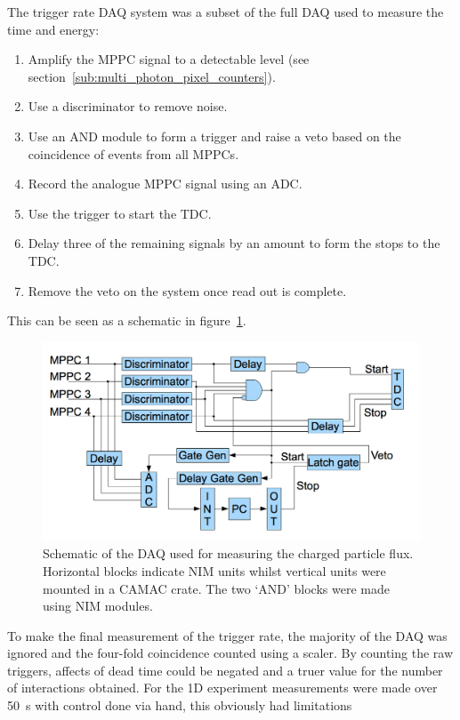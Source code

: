 The trigger rate DAQ system was a subset of the full DAQ used to measure the time and energy:
\begin{enumerate}
  \item Amplify the MPPC signal to a detectable level (see section~\ref{sub:multi_photon_pixel_counters}).
  \item Use a discriminator to remove noise.
  \item Use an AND module to form a trigger and raise a veto based on the coincidence of events from all MPPCs.
  \item Record the analogue MPPC signal using an ADC.
  \item Use the trigger to start the TDC.
  \item Delay three of the remaining signals by an amount to form the stops to the TDC.
  \item Remove the veto on the system once read out is complete.
\end{enumerate}
This can be seen as a schematic in figure~\ref{fig:MuSIC1_DAQ_Block}. 

\begin{figure}[hptb]
  \centering
  \includegraphics[width=.9\textwidth]{images/charged_flux/MuSIC1_DAQ_Block.png}
  \caption{Schematic of the DAQ used for measuring the charged particle flux. Horizontal blocks indicate NIM units whilst vertical units were mounted in a CAMAC crate. The two `AND' blocks were made using NIM modules.}
  \label{fig:MuSIC1_DAQ_Block}
\end{figure}

To make the final measurement of the trigger rate, the majority of the DAQ was ignored and the four-fold coincidence counted using a scaler. By counting the raw triggers, affects of dead time could be negated and a truer value for the number of interactions obtained. For the 1D experiment measurements were made over 50~s with control done via hand, this obviously had limitations 

